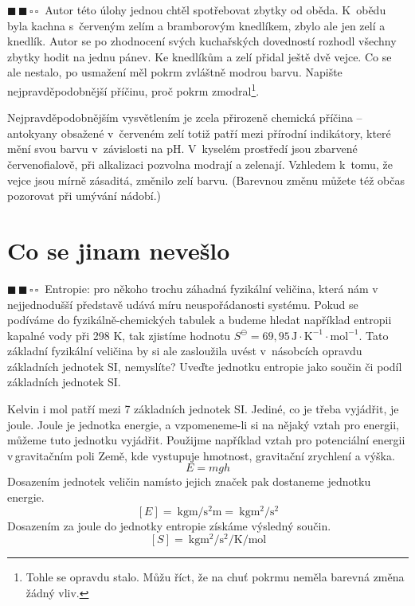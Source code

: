 \documentclass{book}
\newcommand{\dva}{$\blacksquare \, \blacksquare \, \square \, \square \; \; $}
\renewenvironment{quotation}{\par}{\par} %
\begin{document}
\hrulefill %
\begin{quotation}
\dva Autor této úlohy jednou chtěl spotřebovat zbytky od oběda. K~obědu
byla kachna s~červeným zelím a bramborovým knedlíkem, zbylo ale jen
zelí a knedlík. Autor se po zhodnocení svých kuchařských dovedností
rozhodl všechny zbytky hodit na jednu pánev. Ke knedlíkům a zelí přidal
ještě dvě vejce. Co se ale nestalo, po usmažení měl pokrm zvláštně
modrou barvu. Napište nejpravděpodobnější příčinu, proč pokrm zmodral\footnote{Tohle se opravdu stalo. Můžu říct, že na chuť pokrmu neměla barevná
změna žádný vliv.}. 
\end{quotation} \dotfill \par 
Nejpravděpodobnějším vysvětlením je zcela přirozeně chemická
příčina -- antokyany obsažené v~červeném zelí totiž patří mezi přírodní
indikátory, které mění svou barvu v~závislosti na pH. V~kyselém
prostředí jsou zbarvené červenofialově, při alkalizaci pozvolna
modrají a zelenají. Vzhledem k~tomu, že vejce jsou mírně zásaditá, změnilo zelí barvu. (Barevnou změnu můžete též občas pozorovat při umývání nádobí.)

\section{Co se jinam nevešlo}

\begin{quotation}
\dva Entropie: pro někoho trochu záhadná fyzikální veličina, která nám
v nejjednodušší představě udává míru neuspořádanosti systému. Pokud
se podíváme do fyzikálně-chemických tabulek a budeme hledat například
entropii kapalné vody při 298 K, tak zjistíme hodnotu $S^{\ominus}=69,95\,\mathrm{J\cdot K^{-1}\cdot mol^{-1}}$.
Tato základní fyzikální veličina by si ale zasloužila uvést v~násobcích
opravdu základních jednotek SI, nemyslíte? Uveďte jednotku entropie
jako součin či podíl základních jednotek SI.
\end{quotation} \dotfill \par 
Kelvin i mol patří mezi 7 základních jednotek SI. Jediné, co je třeba
vyjádřit, je joule. Joule je jednotka energie, a vzpomeneme-li si na
nějaký vztah pro energii, můžeme tuto jednotku vyjádřit. Použijme
například vztah pro potenciální energii v\,gravitačním poli Země, kde vystupuje hmotnost, gravitační zrychlení a výška.
\[
E=mgh
\]
Dosazením jednotek veličin namísto jejich značek pak dostaneme jednotku energie.
\[
[E]=\SI[inter-unit-product = \ensuremath{{}\cdot{}}]{}{\kilo\gram\metre\per\second\squared\metre}=\SI[inter-unit-product = \ensuremath{{}\cdot{}}]{}{\kilo\gram\metre\squared\per\second\squared}
\]
Dosazením za joule do jednotky entropie získáme výsledný součin.
\[
[S]=\SI[inter-unit-product = \ensuremath{{}\cdot{}}]{}{\kilo\gram\metre\squared\per\second\squared\per\kelvin\per\mole}
\]
\end{document}
